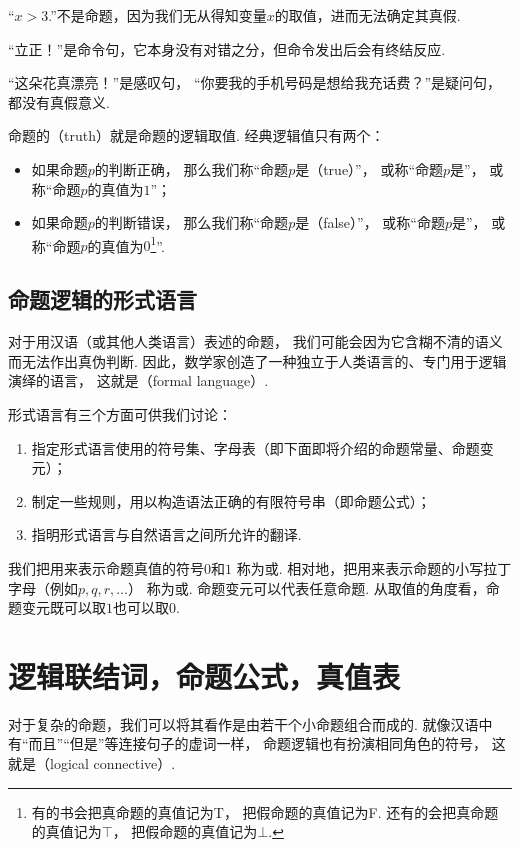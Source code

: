 “\(x>3\).”不是命题，因为我们无从得知变量\(x\)的取值，进而无法确定其真假.

“立正！”是命令句，它本身没有对错之分，但命令发出后会有终结反应.

“这朵花真漂亮！”是感叹句，
“你要我的手机号码是想给我充话费？”是疑问句，
都没有真假意义.

命题的（truth）就是命题的逻辑取值.
经典逻辑值只有两个：\begin{itemize}
	\item 如果命题\(p\)的判断正确，
	那么我们称“命题\(p\)是（true）”，
	或称“命题\(p\)是”，
	或称“命题\(p\)的真值为\(1\)”；
	\item 如果命题\(p\)的判断错误，
	那么我们称“命题\(p\)是（false）”，
	或称“命题\(p\)是”，
	或称“命题\(p\)的真值为\(0\)\footnote{
		有的书会把真命题的真值记为T，
		把假命题的真值记为F.
		还有的会把真命题的真值记为\(\top\)，
		把假命题的真值记为\(\bot\).
	}”.
\end{itemize}

\subsection{命题逻辑的形式语言}
对于用汉语（或其他人类语言）表述的命题，
我们可能会因为它含糊不清的语义而无法作出真伪判断.
因此，数学家创造了一种独立于人类语言的、专门用于逻辑演绎的语言，
这就是（formal language）.

形式语言有三个方面可供我们讨论：\begin{enumerate}
	\item 指定形式语言使用的符号集、字母表（即下面即将介绍的命题常量、命题变元）；
	\item 制定一些规则，用以构造语法正确的有限符号串（即命题公式）；
	\item 指明形式语言与自然语言之间所允许的翻译.
\end{enumerate}

我们把用来表示命题真值的符号\(0\)和\(1\)
称为或.
相对地，把用来表示命题的小写拉丁字母（例如\(p,q,r,\dotsc\)）
称为或.
命题变元可以代表任意命题.
从取值的角度看，命题变元既可以取\(1\)也可以取\(0\).

\section{逻辑联结词，命题公式，真值表}
对于复杂的命题，我们可以将其看作是由若干个小命题组合而成的.
就像汉语中有“而且”“但是”等连接句子的虚词一样，
命题逻辑也有扮演相同角色的符号，
这就是（logical connective）.

